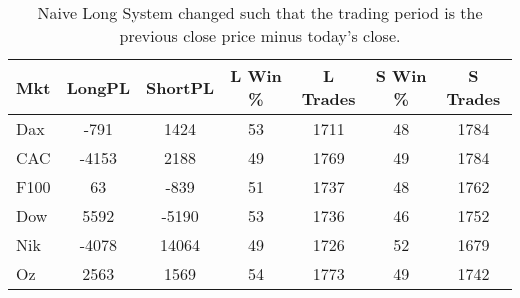 \begin{table}[ht]
\centering
\caption[Naive Long System - Close to Close]{Naive Long System changed such that the trading period is the previous close price minus today's close.} 
\label{tab:mac_trend_results}
\begin{tabular}{lcccccc}
  \toprule Mkt & LongPL & ShortPL & L Win \% & L Trades & S Win \% & S Trades \\ 
  \midrule Dax & -791 & 1424 & 53 & 1711 & 48 & 1784 \\ 
  CAC & -4153 & 2188 & 49 & 1769 & 49 & 1784 \\ 
  F100 & 63 & -839 & 51 & 1737 & 48 & 1762 \\ 
  Dow & 5592 & -5190 & 53 & 1736 & 46 & 1752 \\ 
  Nik & -4078 & 14064 & 49 & 1726 & 52 & 1679 \\ 
  Oz & 2563 & 1569 & 54 & 1773 & 49 & 1742 \\ 
   \bottomrule \end{tabular}
\end{table}
